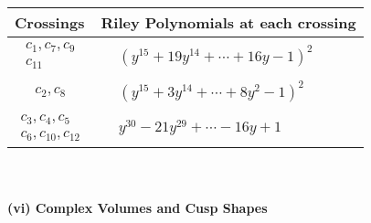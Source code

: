 \documentclass[1p]{elsarticle_modified}
\theoremstyle{definition}
\begin{document}
\begin{tabular}{m{50pt}|m{274pt}}
Crossings & \hspace{64pt}Riley Polynomials at each crossing \\
\hline $$\begin{aligned}c_{1},c_{7},c_{9}\\c_{11}\end{aligned}$$&$\begin{aligned}
&(y^{15}+19 y^{14}+\cdots+16 y-1)^{2}
\end{aligned}$\\
\hline $$\begin{aligned}c_{2},c_{8}\end{aligned}$$&$\begin{aligned}
&(y^{15}+3 y^{14}+\cdots+8 y^2-1)^{2}
\end{aligned}$\\
\hline $$\begin{aligned}c_{3},c_{4},c_{5}\\c_{6},c_{10},c_{12}\end{aligned}$$&$\begin{aligned}
&y^{30}-21 y^{29}+\cdots-16 y+1
\end{aligned}$\\
\hline
\end{tabular}\\~\\
\newpage\flushleft \textbf{(vi) Complex Volumes and Cusp Shapes}
\end{document}
